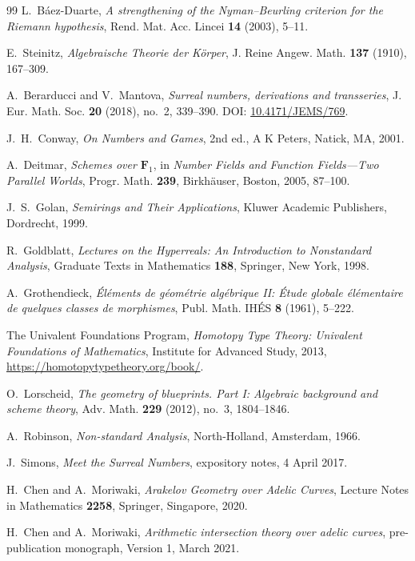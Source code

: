 \documentclass[11pt]{amsart}
\numberwithin{equation}{section}
\theoremstyle{definition}
\newcommand{\Fone}{\mathbf F_1}
\begin{document}
\begin{thebibliography}{99}
L.~B\'aez-Duarte,
\emph{A strengthening of the Nyman--Beurling criterion for the Riemann
hypothesis},
Rend. Mat. Acc. Lincei \textbf{14} (2003), 5--11.

E.~Steinitz,
\emph{Algebraische Theorie der K\"orper},
J. Reine Angew. Math. \textbf{137} (1910), 167--309.

A.~Berarducci and V.~Mantova,
\emph{Surreal numbers, derivations and transseries},
J. Eur. Math. Soc. \textbf{20} (2018), no.~2, 339--390.
DOI: \href{https://doi.org/10.4171/JEMS/769}{10.4171/JEMS/769}.

J.~H.~Conway,
\emph{On Numbers and Games},
2nd ed., A K Peters, Natick, MA, 2001.

A.~Deitmar,
\emph{Schemes over $\Fone$},
in \emph{Number Fields and Function Fields---Two Parallel Worlds},
Progr. Math. \textbf{239}, Birkh\"auser, Boston, 2005, 87--100.

J.~S.~Golan,
\emph{Semirings and Their Applications},
Kluwer Academic Publishers, Dordrecht, 1999.

R.~Goldblatt,
\emph{Lectures on the Hyperreals: An Introduction to Nonstandard Analysis},
Graduate Texts in Mathematics \textbf{188}, Springer, New York, 1998.

A.~Grothendieck,
\emph{\'El\'ements de g\'eom\'etrie alg\'ebrique II: \'Etude globale
\'el\'ementaire de quelques classes de morphismes},
Publ. Math. IH\'ES \textbf{8} (1961), 5--222.

The Univalent Foundations Program,
\emph{Homotopy Type Theory: Univalent Foundations of Mathematics},
Institute for Advanced Study, 2013,
\url{https://homotopytypetheory.org/book/}.

O.~Lorscheid,
\emph{The geometry of blueprints. Part I: Algebraic background and scheme
theory},
Adv. Math. \textbf{229} (2012), no.~3, 1804--1846.

A.~Robinson,
\emph{Non-standard Analysis},
North-Holland, Amsterdam, 1966.

J.~Simons,
\emph{Meet the Surreal Numbers},
expository notes, 4 April 2017.


H.~Chen and A.~Moriwaki,
\emph{Arakelov Geometry over Adelic Curves},
Lecture Notes in Mathematics \textbf{2258}, Springer, Singapore, 2020.

H.~Chen and A.~Moriwaki,
\emph{Arithmetic intersection theory over adelic curves},
pre-publication monograph, Version 1, March 2021.


\end{thebibliography}
\end{document}
